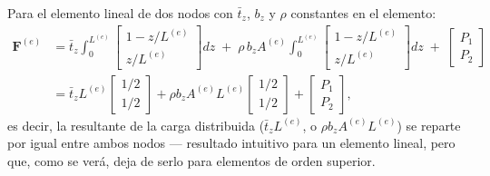 Para el elemento lineal de dos nodos con $\bar t_z$, $b_z$ y $\rho$ constantes en el elemento:
\begin{align*}
\bm F^{(e)} &= \bar t_z \int_0^{L^{(e)}} \begin{bmatrix} 1-z/L^{(e)} \\ z/L^{(e)} \end{bmatrix} dz \; + \; \rho\, b_z A^{(e)} \int_0^{L^{(e)}} \begin{bmatrix} 1-z/L^{(e)} \\ z/L^{(e)} \end{bmatrix} dz \; + \; \begin{bmatrix} P_1 \\ P_2 \end{bmatrix} \\
&= \bar t_z L^{(e)} \begin{bmatrix} 1/2 \\ 1/2 \end{bmatrix} + \rho b_z A^{(e)} L^{(e)} \begin{bmatrix} 1/2 \\ 1/2 \end{bmatrix} + \begin{bmatrix} P_1 \\ P_2 \end{bmatrix} ,
\end{align*}
es decir, la resultante de la carga distribuida ($\bar t_z L^{(e)}$, o $\rho b_z A^{(e)}L^{(e)}$) se reparte por igual entre ambos nodos --- resultado intuitivo para un elemento lineal, pero que, como se verá, deja de serlo para elementos de orden superior.

